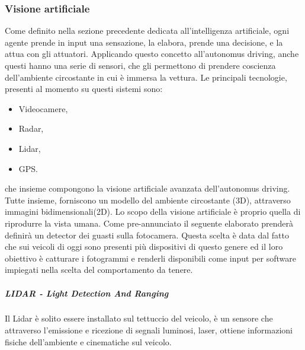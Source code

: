 \documentclass[14pt]{extarticle}
\begin{document}
\subsubsection{Visione artificiale}
Come definito nella sezione precedente dedicata all'intelligenza artificiale, ogni agente prende in input una sensazione, la elabora, prende una decisione, e la attua con gli attuatori. Applicando questo concetto all'autonomus driving, anche questi hanno una serie di sensori, che gli permettono di prendere coscienza dell'ambiente circostante in cui è immersa la vettura.
Le principali tecnologie, presenti al momento su questi sistemi sono\cite{das2018risk}:
\begin{itemize}
\item Videocamere,
\item Radar,
\item Lidar,
\item GPS.
\end{itemize}
che insieme compongono la visione artificiale avanzata dell'autonomus driving.
Tutte insieme, forniscono un modello del ambiente circostante (3D),  attraverso immagini bidimensionali(2D).
Lo scopo della visione artificiale è proprio quella di riprodurre la vista umana.\cite{wiki:visart}
Come pre-annunciato il seguente elaborato prenderà definirà un detector dei guasti sulla fotocamera. Questa scelta è data dal fatto che sui veicoli
di oggi sono presenti più dispositivi di questo genere ed il loro obiettivo
è catturare i fotogrammi e renderli disponibili come input per software
impiegati nella scelta del comportamento da tenere.
\subparagraph{LIDAR - Light Detection And Ranging}
Il Lidar è  solito essere installato sul tettuccio del veicolo, è un sensore che attraverso l'emissione e ricezione di segnali luminosi, laser, ottiene informazioni fisiche  dell'ambiente e  cinematiche sul  veicolo.

\end{document}
